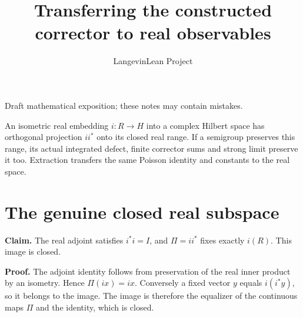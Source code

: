 \documentclass[11pt,a4paper]{article}
\title{\texorpdfstring{Transferring the constructed corrector to real observables}{Transferring the constructed corrector to real observables}}
\author{LangevinLean Project}
\date{}
\begin{document}
\maketitle
Draft mathematical exposition; these notes may contain mistakes.


An isometric real embedding \(i:R\to H\) into a complex Hilbert space has orthogonal projection \(ii^*\) onto its closed real range. If a semigroup preserves this range, its actual integrated defect, finite corrector sums and strong limit preserve it too. Extraction transfers the same Poisson identity and constants to the real space.


\section{\texorpdfstring{The genuine closed real subspace}{The genuine closed real subspace}}


\textbf{Claim.} The real adjoint satisfies \(i^*i=I\), and \(\Pi=ii^*\) fixes exactly \(i(R)\). This image is closed.



\textbf{Proof.} The adjoint identity follows from preservation of the real inner product by an isometry. Hence \(\Pi(ix)=ix\). Conversely a fixed vector \(y\) equals \(i(i^*y)\), so it belongs to the image. The image is therefore the equalizer of the continuous maps \(\Pi\) and the identity, which is closed.
\end{document}
